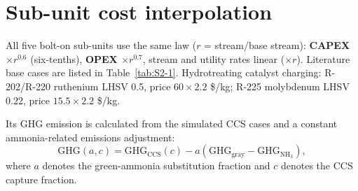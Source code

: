 \documentclass[11pt]{article}
\begin{document}
\section{Sub-unit cost interpolation}\label{sec:S2}

All five bolt-on sub-units use the same law
($r$ = stream/base stream): \textbf{CAPEX $\times r^{0.6}$} (six-tenths), \textbf{OPEX $\times r^{0.7}$},
stream and utility rates linear ($\times r$). Literature base cases are listed in Table~\ref{tab:S2-1}.
Hydrotreating catalyst charging: R-202/R-220 ruthenium LHSV 0.5,
price $60 \times 2.2$ \$/kg; R-225 molybdenum LHSV 0.22, price $15.5 \times 2.2$ \$/kg.

Its GHG emission is calculated from the simulated CCS cases and a constant ammonia-related emissions adjustment:
    \begin{equation}
    \mathrm{GHG}(a,c) =
    \mathrm{GHG}_{\mathrm{CCS}}(c)
    -a\left(\mathrm{GHG}_{\mathrm{gray}}-\mathrm{GHG}_{\mathrm{NH}_3}\right),
    \end{equation}
    where \(a\) denotes the green-ammonia substitution fraction and \(c\) denotes the CCS capture fraction. 

\begin{table}[htbp]
  \centering
  \caption{Literature base cases of the bolt-on sub-units.}
  \label{tab:S2-1}
\end{table}
\end{document}

